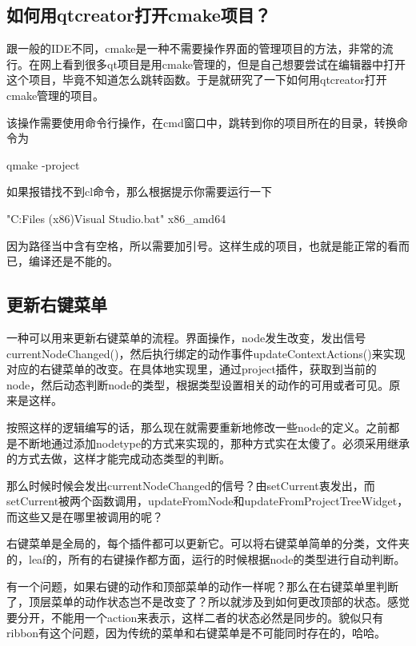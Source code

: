 \subsection{如何用qtcreator打开cmake项目？}
跟一般的IDE不同，cmake是一种不需要操作界面的管理项目的方法，非常的流行。在网上看到很多qt项目是用cmake管理的，但是自己想要尝试在编辑器中打开这个项目，毕竟不知道怎么跳转函数。于是就研究了一下如何用qtcreator打开cmake管理的项目。

该操作需要使用命令行操作，在cmd窗口中，跳转到你的项目所在的目录，转换命令为

qmake -project

如果报错找不到cl命令，那么根据提示你需要运行一下
\begin{listlsting}
"C:\Program Files (x86)\Microsoft Visual Studio\Community\VC\Auxiliary\Build\vcvarsall.bat" x86_amd64    
\end{listlsting}
因为路径当中含有空格，所以需要加引号。这样生成的项目，也就是能正常的看而已，编译还是不能的。

\subsection{更新右键菜单}
一种可以用来更新右键菜单的流程。界面操作，node发生改变，发出信号currentNodeChanged()，然后执行绑定的动作事件updateContextActions()来实现对应的右键菜单的改变。在具体地实现里，通过project插件，获取到当前的node，然后动态判断node的类型，根据类型设置相关的动作的可用或者可见。原来是这样。

按照这样的逻辑编写的话，那么现在就需要重新地修改一些node的定义。之前都是不断地通过添加nodetype的方式来实现的，那种方式实在太傻了。必须采用继承的方式去做，这样才能完成动态类型的判断。

那么时候时候会发出currentNodeChanged的信号？由setCurrent衷发出，而setCurrent被两个函数调用，updateFromNode和updateFromProjectTreeWidget，而这些又是在哪里被调用的呢？

右键菜单是全局的，每个插件都可以更新它。可以将右键菜单简单的分类，文件夹的，leaf的，所有的右键操作都方面，运行的时候根据node的类型进行自动判断。

有一个问题，如果右键的动作和顶部菜单的动作一样呢？那么在右键菜单里判断了，顶层菜单的动作状态岂不是改变了？所以就涉及到如何更改顶部的状态。感觉要分开，不能用一个action来表示，这样二者的状态必然是同步的。貌似只有ribbon有这个问题，因为传统的菜单和右键菜单是不可能同时存在的，哈哈。


